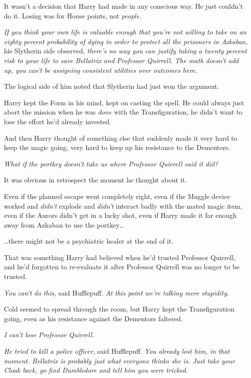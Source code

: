 It wasn't a decision that Harry had made in any conscious way. He just
couldn't do it. Losing was for House points, not \emph{people.}

\emph{If you think your own life is valuable enough that you're not
willing to take on an eighty percent probability of dying in order to
protect all the prisoners in Azkaban,} his Slytherin side observed,
\emph{there's no way you can justify taking a twenty percent risk to
your life to save Bellatrix and Professor Quirrell. The math doesn't add
up, you can't be assigning consistent utilities over outcomes here.}

The logical side of him noted that Slytherin had just won the argument.

Harry kept the Form in his mind, kept on casting the spell. He could
always just abort the mission when he was \emph{done} with the
Transfiguration, he didn't want to lose the effort he'd already
invested.

And then Harry thought of something else that suddenly made it very hard
to keep the magic going, very hard to keep up his resistance to the
Dementors.

\emph{What if the portkey doesn't take us where Professor Quirrell said
it did?}

It was obvious in retrospect the moment he thought about it.

Even if the planned escape went completely right, even if the Muggle
device worked and \emph{didn't} explode and \emph{didn't} interact badly
with the mated magic item, even if the Aurors didn't get in a lucky
shot, even if Harry made it far enough away from Azkaban to use the
portkey\ldots{}

\ldots{}there might not be a psychiatric healer at the end of it.

That was something Harry had believed when he'd trusted Professor
Quirrell, and he'd forgotten to re-evaluate it after Professor Quirrell
was no longer to be trusted.

\emph{You can't do this,} said Hufflepuff. \emph{At this point we're
talking mere stupidity.}

Cold seemed to spread through the room, but Harry kept the
Transfiguration going, even as his resistance against the Dementors
faltered.

\emph{I can't lose Professor Quirrell.}

\emph{He tried to kill a police officer,} said Hufflepuff. \emph{You
already lost him, in that moment. Bellatrix is probably just what
everyone thinks she is. Just take your Cloak back, go find Dumbledore
and tell him you were tricked.}

